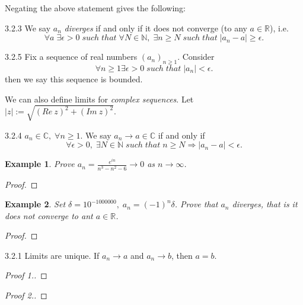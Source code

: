 \documentclass[a4paper]{article}
\def\rr{{\mathbb R}}
\def\cc{{\mathbb C}}
\def\nn{{\mathbb N}}
\newtheorem{example}{Example}[subsection]
\begin{document}
  Negating the above statement gives the following:
\begin{definition}{3.2.3}{}
    We say  $a_n$ \textit{diverges} if and only if it does not converge (to any $a\in \rr$), i.e.
    \begin{equation*}
        \forall a \; \exists \epsilon >0 \; such \; that\; \forall N \in \nn ,\; \exists n \geq N \; such \;that \; |a_n-a|\geq \epsilon.
    \end{equation*}
\end{definition}
\begin{definition}{3.2.5}{}
    Fix a sequence of real numbers $(a_n)_{n\geq 1}$. Consider 
    \begin{equation*}
        \forall n\geq 1 \exists \epsilon >0 \; such \; that \; |a_n|<\epsilon.
    \end{equation*}
    then we say this sequence is bounded.
\end{definition}
We can also define limits for \textit{complex sequences}. Let $|z|:= \sqrt{(Re\:z)^2+(Im\:z)^2}$.
\begin{definition}{3.2.4}{}
        $a_n\in \cc ,\; \forall n\geq 1$. We say $a_n\rightarrow a\in \cc$ if and only if
        \begin{equation*}
            \forall \epsilon >0,\; \exists N \in \nn \; such \; that\; n\geq N \Longrightarrow |a_n-a|<\epsilon. 
        \end{equation*}
\end{definition}
\begin{example}
    Prove $a_n=\frac{e^{in}}{n^3-n^2-6}\rightarrow 0$ as $n\rightarrow \infty$.
\end{example}
\begin{proof}

\end{proof}
\begin{example}
    Set $\delta = 10^{-1000000},\; a_n=(-1)^n\delta$. Prove that $a_n$ diverges, that is it does not converge to ant $a\in \rr$.
\end{example}
\begin{proof}
\end{proof}
\begin{theorem}{3.2.1}{}
    Limits are unique. If $a_n\rightarrow a$ and $a_n\rightarrow b$, then $a=b$.
\end{theorem}
\begin{proof}[Proof 1.]
\end{proof}
\begin{proof}[Proof 2.]
\end{proof}
\end{document}
